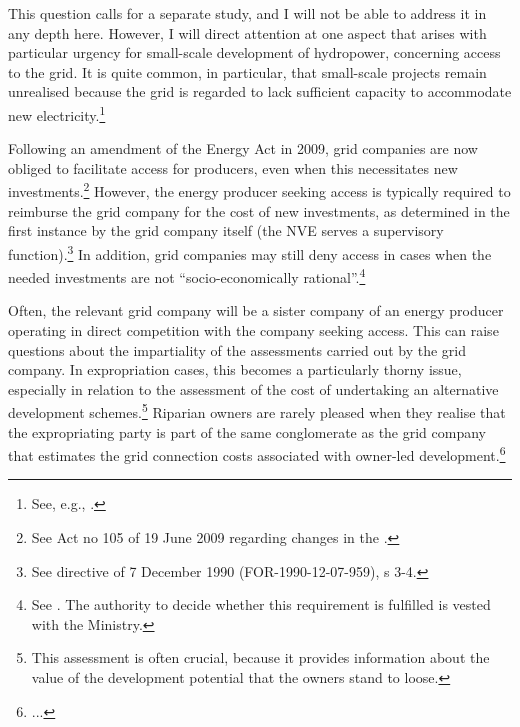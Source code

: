 This question calls for a separate study, and I will not be able to address it in any depth here. However, I will direct attention at one aspect that arises with particular urgency for small-scale development of hydropower, concerning access to the grid. It is quite common, in particular, that small-scale projects remain unrealised because the grid is regarded to lack sufficient capacity to accommodate new electricity.\footnote{See, e.g., \cite[84,161-162]{nou129}.}

Following an amendment of the Energy Act in 2009, grid companies are now obliged to facilitate access for producers, even when this necessitates new investments.\footnote{See Act no 105 of 19 June 2009 regarding changes in the \cite{ea90}.} However, the energy producer seeking access is typically required to reimburse the grid company for the cost of new investments, as determined in the first instance by the grid company itself (the NVE serves a supervisory function).\footnote{See directive of 7 December 1990 (FOR-1990-12-07-959), s 3-4.} In addition, grid companies may still deny access in cases when the needed investments are not ``socio-economically rational''.\footnote{See \cite[3-4]{ea90}. The authority to decide whether this requirement is fulfilled is vested with the Ministry.} %

Often, the relevant grid company will be a sister company of an energy producer operating in direct competition with the company seeking access. This can raise questions about the impartiality of the assessments carried out by the grid company. In expropriation cases, this becomes a particularly thorny issue, especially in relation to the assessment of the cost of undertaking an alternative development schemes.\footnote{This assessment is often crucial, because it provides information about the value of the development potential that the owners stand to loose.} Riparian owners are rarely pleased when they realise that the expropriating party is part of the same conglomerate as the grid company that estimates the grid connection costs associated with owner-led development.\footnote{...}


